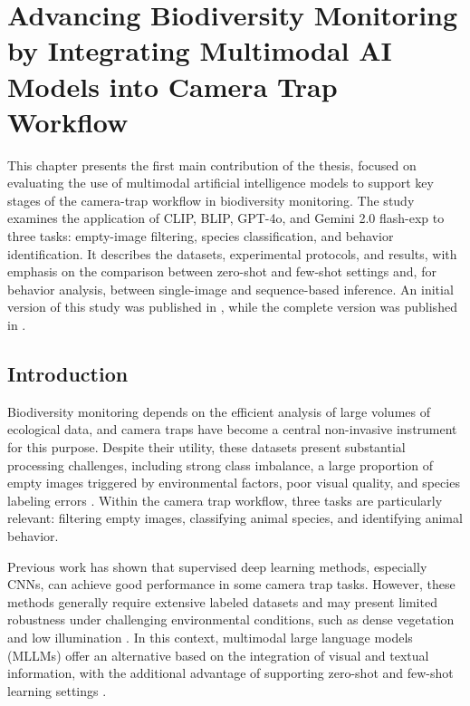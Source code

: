 \chapter{Advancing Biodiversity Monitoring by Integrating Multimodal AI Models into Camera Trap Workflow}\label{cap:experiment_01}

This chapter presents the first main contribution of the thesis, focused on evaluating the use of multimodal artificial intelligence models to support key stages of the camera-trap workflow in biodiversity monitoring. The study examines the application of CLIP, BLIP, GPT-4o, and Gemini 2.0 flash-exp to three tasks: empty-image filtering, species classification, and behavior identification. It describes the datasets, experimental protocols, and results, with emphasis on the comparison between zero-shot and few-shot settings and, for behavior analysis, between single-image and sequence-based inference. An initial version of this study was published in \citep{alencar2024zero}, while the complete version was published in \citep{alencar2026advancing}.

\section{Introduction}

Biodiversity monitoring depends on the efficient analysis of large volumes of ecological data, and camera traps have become a central non-invasive instrument for this purpose. Despite their utility, these datasets present substantial processing challenges, including strong class imbalance, a large proportion of empty images triggered by environmental factors, poor visual quality, and species labeling errors \citep{cunha2023bag,swanson2015snapshot,iannarilli2021evaluating,alencar2024zero}. Within the camera trap workflow, three tasks are particularly relevant: filtering empty images, classifying animal species, and identifying animal behavior.

Previous work has shown that supervised deep learning methods, especially CNNs, can achieve good performance in some camera trap tasks. However, these methods generally require extensive labeled datasets and may present limited robustness under challenging environmental conditions, such as dense vegetation and low illumination \citep{cunha2021filtering,binta2023animal,vecvanags2022ungulate,alencar2023context,velez2023evaluation}. In this context, multimodal large language models (MLLMs) offer an alternative based on the integration of visual and textual information, with the additional advantage of supporting zero-shot and few-shot learning settings \citep{li2022blip,radford2021learning,liu2024improved}.

